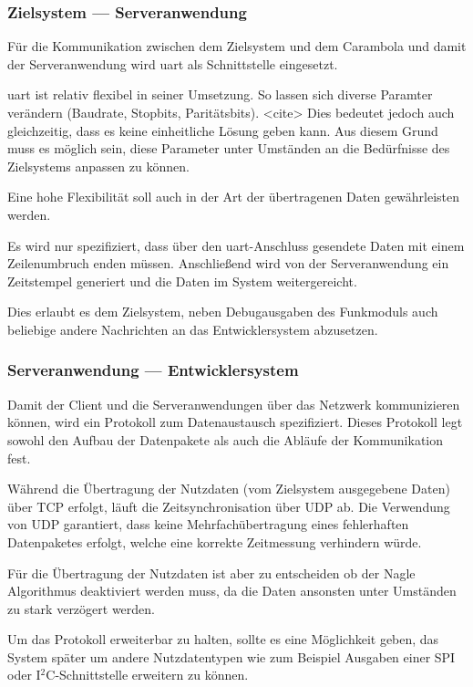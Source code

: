 \subsubsection*{Zielsystem --- Serveranwendung}
Für die Kommunikation zwischen dem Zielsystem und dem Carambola und damit der
Serveranwendung wird \gls{uart} als Schnittstelle eingesetzt.

\gls{uart} ist relativ flexibel in seiner Umsetzung. So lassen sich
diverse Paramter verändern (Baudrate, Stopbits, Paritätsbits). <cite> Dies
bedeutet jedoch auch gleichzeitig, dass es keine einheitliche Lösung geben kann.
Aus diesem Grund muss es möglich sein, diese Parameter unter Umständen an die
Bedürfnisse des Zielsystems anpassen zu können.

Eine hohe Flexibilität soll auch in der Art der übertragenen Daten
gewährleisten werden.

Es wird nur spezifiziert, dass über den \gls{uart}-Anschluss
gesendete Daten mit einem Zeilenumbruch enden müssen. Anschließend wird von der
Serveranwendung ein Zeitstempel generiert und die Daten im System
weitergereicht.

Dies erlaubt es dem Zielsystem, neben Debugausgaben des Funkmoduls auch
beliebige andere Nachrichten an das Entwicklersystem abzusetzen.

\subsubsection*{Serveranwendung --- Entwicklersystem}
Damit der Client und die Serveranwendungen über das Netzwerk kommunizieren
können, wird ein Protokoll zum Datenaustausch spezifiziert. Dieses Protokoll
legt sowohl den Aufbau der Datenpakete als auch die Abläufe der Kommunikation
fest.

Während die Übertragung der Nutzdaten (vom Zielsystem ausgegebene Daten) über
TCP erfolgt, läuft die Zeitsynchronisation über UDP ab. Die Verwendung von UDP
garantiert, dass keine Mehrfachübertragung eines fehlerhaften Datenpaketes
erfolgt, welche eine korrekte Zeitmessung verhindern würde.

Für die Übertragung der Nutzdaten ist aber zu entscheiden ob der Nagle
Algorithmus\cite{RFC896} deaktiviert werden muss, da die Daten ansonsten unter
Umständen zu stark verzögert werden.

Um das Protokoll erweiterbar zu halten, sollte es eine Möglichkeit geben, das
System später um andere Nutzdatentypen wie zum Beispiel Ausgaben einer SPI oder
I$^2$C-Schnittstelle erweitern zu können.

